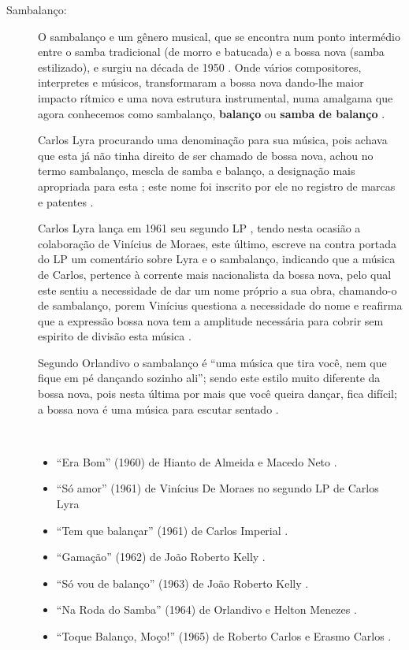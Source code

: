 \begin{description}
\item[Sambalanço:]
\label{ref:sambalanco}
O sambalanço e um gênero musical,
que se encontra num ponto intermédio entre o samba tradicional (de morro e batucada)
e a bossa nova (samba estilizado), e surgiu na década de 1950 \cite[pp. 119]{diniz2008almanaque}.
Onde vários compositores, interpretes e músicos, 
transformaram a bossa nova dando-lhe maior impacto rítmico e uma nova estrutura instrumental,
numa amalgama que agora conhecemos como sambalanço, \textbf{balanço} ou \textbf{samba de balanço} \cite{de2017sambalanco}.

Carlos Lyra procurando uma denominação para sua música, 
pois achava que esta já não tinha direito de ser chamado de bossa nova,
achou no termo sambalanço, mescla de samba e balanço, a designação mais apropriada para esta \cite{castro2011bossa};
este nome foi inscrito por ele no registro de marcas e patentes \cite[pp. 127]{vianna1999bezerra} \cite{castro2011bossa}.


Carlos Lyra lança em 1961  seu segundo LP \cite[pp. 142]{lyrasongbook}  \cite{castro2011bossa}, 
tendo nesta ocasião a colaboração de Vinícius de Moraes,
este último, escreve na contra portada do LP um comentário sobre Lyra e o sambalanço,
indicando que a música de Carlos, pertence à corrente mais nacionalista da bossa nova,
pelo qual este sentiu a necessidade de dar um nome próprio a sua obra, 
chamando-o de sambalanço, 
porem Vinícius questiona a necessidade do nome e reafirma que a expressão 
 bossa nova tem a amplitude necessária para cobrir sem espirito de divisão esta música \cite{castro2011bossa}.

Segundo Orlandivo o sambalanço é ``uma música que tira você, nem que fique em pé dançando sozinho ali'';
sendo este estilo muito diferente da bossa nova, pois nesta última por mais que você queira dançar, fica difícil;
a bossa nova é uma música para escutar sentado \cite{de2017sambalanco}.
\begin{example} ~

\begin{itemize}
\item ``Era Bom'' (1960) de Hianto de Almeida e Macedo Neto  \cite[pp. 123]{de2003tem}.
\item ``Só amor'' (1961) de Vinícius De Moraes no segundo LP de Carlos Lyra \cite[pp. 142]{lyrasongbook}  
\item ``Tem que balançar'' (1961) de Carlos Imperial  \cite{de2017sambalanco}.
\item ``Gamação'' (1962) de João Roberto Kelly \cite[pp. 122]{de2003tem}.
\item ``Só vou de balanço'' (1963) de João Roberto Kelly \cite{de2017sambalanco}.
\item ``Na Roda do Samba'' (1964) de Orlandivo e Helton Menezes \cite{de2017sambalanco} \cite[pp. 122]{de2003tem}.
\item ``Toque Balanço, Moço!'' (1965) de Roberto Carlos e Erasmo Carlos \cite{de2017sambalanco} \cite[pp. 123]{de2003tem}.
\end{itemize}
\end{example}


\end{description}
